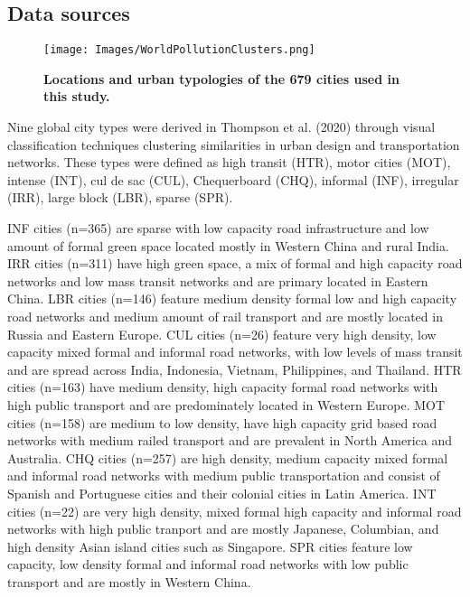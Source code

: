 \documentclass[preprint,12pt]{elsarticle}
\begin{document}
\subsection*{Data sources}


\begin{figure}
\centering
\texttt{[image: Images/WorldPollutionClusters.png]}
\caption{\bf Locations and urban typologies of the 679 cities used in this study.}
 \label{fig:clusters}
\end{figure}

Nine global city types were derived in Thompson et al. (2020) \cite{Thompson2020} through visual classification techniques clustering similarities in urban design and transportation networks. These types were defined as high transit (HTR), motor cities (MOT), intense (INT), cul de sac (CUL), Chequerboard (CHQ), informal (INF), irregular (IRR), large block (LBR), sparse (SPR). 

INF cities (n=365) are sparse with low capacity road infrastructure and low amount of formal green space located mostly in Western China and rural India. IRR cities (n=311) have high green space, a mix of formal and high capacity road networks and low mass transit networks and are primary located in Eastern China. LBR cities (n=146) feature medium density formal low and high capacity road networks and medium amount of rail transport and are mostly located in Russia and Eastern Europe. CUL cities (n=26) feature very high density, low capacity mixed formal and informal road networks, with low levels of mass transit and are spread across India, Indonesia, Vietnam, Philippines, and Thailand. HTR cities (n=163) have medium density, high capacity formal road networks with high public transport and are predominately located in Western Europe. MOT cities (n=158) are medium to low density, have high capacity grid based road networks with medium railed transport and are prevalent in North America and Australia. CHQ cities (n=257) are high density, medium capacity mixed formal and informal road networks with medium public transportation and consist of Spanish and Portuguese cities and their colonial cities in Latin America. INT cities (n=22) are very high density, mixed formal high capacity and informal road networks with high public tranport and are mostly Japanese, Columbian, and high density Asian island cities such as Singapore. SPR cities feature low capacity, low density formal and informal road networks with low public transport and are mostly in Western China.
\end{document}
